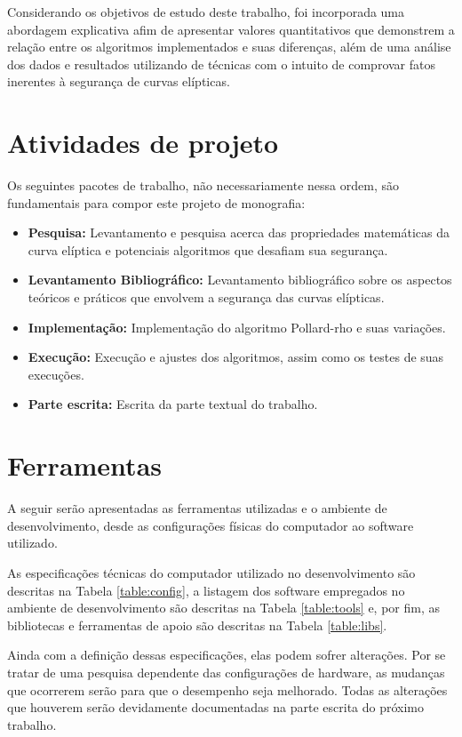 Considerando os objetivos de estudo deste trabalho, foi incorporada uma abordagem explicativa afim de apresentar valores quantitativos que demonstrem a relação entre os algoritmos implementados e suas diferenças, além de uma análise dos dados e resultados utilizando de técnicas com o intuito de comprovar fatos inerentes à segurança de curvas elípticas.

%
%
\section{Atividades de projeto}
Os seguintes pacotes de trabalho, não necessariamente nessa ordem, são fundamentais para compor este projeto de monografia:
\begin{itemize}
\item \textbf{Pesquisa:} Levantamento e pesquisa acerca das propriedades matemáticas da curva elíptica e potenciais algoritmos que desafiam sua segurança.
\item \textbf{Levantamento Bibliográfico:} Levantamento bibliográfico sobre os aspectos teóricos e práticos que envolvem a segurança das curvas elípticas.
\item \textbf{Implementação:} Implementação do algoritmo Pollard-rho e suas variações.
\item \textbf{Execução:} Execução e ajustes dos algoritmos, assim como os testes de suas execuções.
\item \textbf{Parte escrita:} Escrita da parte textual do trabalho.
\end{itemize}

\section{Ferramentas}
A seguir serão apresentadas as ferramentas utilizadas e o ambiente de desenvolvimento, desde as configurações físicas do computador ao software utilizado.

As especificações técnicas do computador utilizado no desenvolvimento são descritas na Tabela \ref{table:config}, a listagem dos software empregados no ambiente de desenvolvimento são descritas na Tabela \ref{table:tools} e, por fim, as bibliotecas e ferramentas de apoio são descritas na Tabela \ref{table:libs}.

Ainda com a definição dessas especificações, elas podem sofrer alterações. Por se tratar de uma pesquisa dependente das configurações de hardware, as mudanças que ocorrerem serão para que o desempenho seja melhorado. Todas as alterações que houverem serão devidamente documentadas na parte escrita do próximo trabalho.

